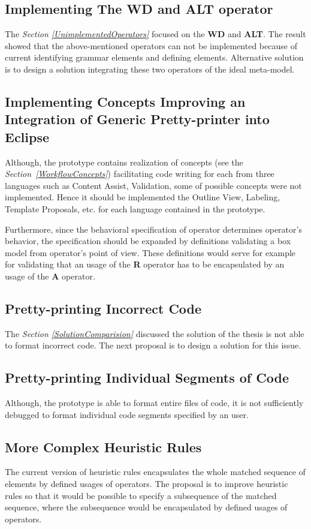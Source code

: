 \documentclass[12pt,notitlepage,a4paper]{report}
\begin{document}
\subsection{Implementing The WD and ALT operator}
The \textit{Section \ref{UnimplementedOperators}} focused on the \textbf{WD} and \textbf{ALT}. The result showed that the above-mentioned operators can not be implemented because of current identifying grammar elements and defining elements. Alternative solution is to design a solution integrating these two operators of the ideal meta-model.

\subsection{Implementing Concepts Improving an Integration of Generic Pretty-printer into Eclipse}
Although, the prototype contains realization of concepts (see the \textit{Section~\ref{WorkflowConcepts}}) facilitating code writing for each from three languages such as Content Assist, Validation, some of possible concepts were not implemented. Hence it should be implemented the Outline View, Labeling, Template Proposals, etc. for each language contained in the prototype.

Furthermore, since the behavioral specification of operator determines operator's behavior, the specification should be expanded by definitions validating a box model from operator's point of view. These definitions would serve for example for validating that an usage of the \textbf{R} operator has to be encapsulated by an usage of the \textbf{A} operator. 

\subsection{Pretty-printing Incorrect Code}
The \textit{Section \ref{SolutionComparision}} discussed the solution of the thesis  is not able to format incorrect code. The next proposal is to design a solution for this issue.

\subsection{Pretty-printing Individual Segments of Code}
Although, the prototype is able to format entire files of code, it is not sufficiently debugged to format individual code segments specified by an user.

\subsection{More Complex Heuristic Rules}
The current version of heuristic rules encapsulates the whole matched sequence of elements by defined usages of operators. The proposal is to improve heuristic rules so that it would be possible to specify a subsequence of the matched sequence, where the subsequence would be encapsulated by defined usages of operators.
\end{document}
